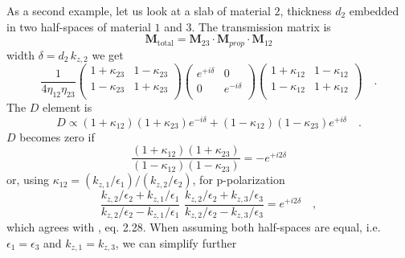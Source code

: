 As a second  example, let us look at a slab of material $2$, thickness $d_2$ embedded in two half-spaces of material $1$ and $3$. The transmission matrix is
\begin{equation}
\mathbf{M}_\text{total} = \mathbf{M}_{23} \cdot \mathbf{M}_{prop} \cdot \mathbf{M}_{12}
\end{equation}
width $\delta = d_2 \, k_{z,2}$ we get
\begin{equation}
\frac{ 1}{4 \eta_{12} \eta_{23}}
\begin{pmatrix}
1 + \kappa_{23} & 1  -\kappa_{23} \\  1  - \kappa_{23}  & 1 + \kappa_{23} \\
\end{pmatrix} 
%
\begin{pmatrix}
e^{+i \delta } & 0 \\0 & e^{-i \delta } \\
\end{pmatrix}
%
\begin{pmatrix}
1 + \kappa_{12} & 1  -\kappa_{12} \\  1  - \kappa_{12}  & 1 + \kappa_{12} \\
\end{pmatrix}  \quad . 
\end{equation}
The $D$ element is 
\begin{equation}
D \propto  (1 + \kappa_{12})(1 + \kappa_{23})e^{-i \delta }  +  (1 - \kappa_{12})(1 - \kappa_{23})e^{+i \delta }  \quad . 
\end{equation}
$D$ becomes zero if 
\begin{equation}
\frac{  (1 + \kappa_{12})(1 + \kappa_{23})   }{ (1 - \kappa_{12})(1 - \kappa_{23})} = - e^{+i 2 \delta } 
\end{equation}
or, using $\kappa_{12} = (k_{z,1} / \epsilon_1) / (k_{z,2} / \epsilon_2)$, for p-polarization
\begin{equation}
\frac{  k_{z,2} / \epsilon_2 + k_{z,1} / \epsilon_1   }{ k_{z,2} / \epsilon_2 - k_{z,1} / \epsilon_1} 
%
\, \,
\frac{  k_{z,2} / \epsilon_2 + k_{z,3} / \epsilon_3   }{ k_{z,2} / \epsilon_2 - k_{z,3} / \epsilon_3} 
%
=  e^{+i 2 \delta }  \quad ,
\end{equation}
which agrees with \cite{Maier2007}, eq. 2.28.
When assuming both half-spaces are equal, i.e. $\epsilon_1 = \epsilon_3$ and $k_{z,1} = k_{z,3}$, we can simplify further
